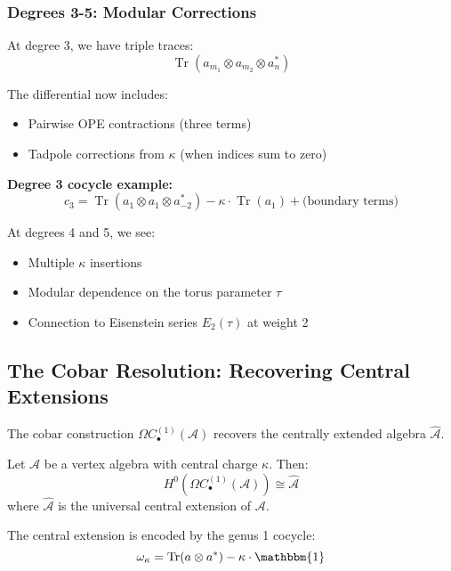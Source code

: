 \begin{center}
\end{center}

\subsubsection{Degrees 3-5: Modular Corrections}

At degree 3, we have triple traces:
$$\operatorname{Tr}(a_{m_1} \otimes a_{m_2} \otimes a^*_n)$$

The differential now includes:
\begin{itemize}
\item Pairwise OPE contractions (three terms)
\item Tadpole corrections from $\kappa$ (when indices sum to zero)
\end{itemize}

\textbf{Degree 3 cocycle example:}
$$c_3 = \operatorname{Tr}(a_1 \otimes a_1 \otimes a^*_{-2}) 
- \kappa \cdot \operatorname{Tr}(a_1) + \text{(boundary terms)}$$

At degrees 4 and 5, we see:
\begin{itemize}
\item Multiple $\kappa$ insertions
\item Modular dependence on the torus parameter $\tau$
\item Connection to Eisenstein series $E_2(\tau)$ at weight 2
\end{itemize}

\subsection{The Cobar Resolution: Recovering Central Extensions}

The cobar construction $\Omega C_{\bullet}^{(1)}(\mathcal{A})$ recovers the
centrally extended algebra $\widehat{\mathcal{A}}$.

\begin{theorem}
Let $\mathcal{A}$ be a vertex algebra with central charge $\kappa$. Then:
$$H^0(\Omega C_{\bullet}^{(1)}(\mathcal{A})) \cong \widehat{\mathcal{A}}$$
where $\widehat{\mathcal{A}}$ is the universal central extension of $\mathcal{A}$.

The central extension is encoded by the genus 1 cocycle:
$$\omega_{\kappa} = \operatorname{Tr}(a \otimes a^*) - \kappa \cdot \mathbbm{1}$$
\end{theorem}

